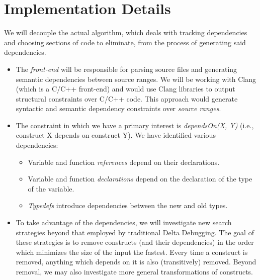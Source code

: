 \documentclass[11pt]{article}
\begin{document}
\section{Implementation Details}
We will decouple the actual algorithm, which deals with tracking dependencies
and choosing sections of code to eliminate, from the process of generating said
dependencies.

\begin{itemize}
\item The \emph{front-end} will be responsible for parsing source files and
  generating semantic dependencies between source ranges. We will be working
  with Clang (which is a C/C++ front-end) and would use Clang libraries to
  output structural constraints over C/C++ code.  This approach would generate
  syntactic and semantic dependency constraints over \emph{source ranges}.
\item The constraint in which we have a primary interest is \emph{dependsOn(X,
  Y)} (i.e., construct X depends on construct Y).  We have identified various
  dependencies:

\begin{itemize}
\item{Variable and function \emph{references} depend on their declarations.}
\item{Variable and function \emph{declarations} depend on the declaration of the
type of the variable.}
\item{\emph{Typedefs} introduce dependencies between the new and old types.}
\end{itemize}

\item To take advantage of the dependencies, we will investigate new search
  strategies beyond that employed by traditional Delta Debugging.  The goal
  of these strategies is to remove constructs (and their dependencies) in the
  order which minimizes the size of the input the fastest.
  Every time a construct is removed, anything which depends on
  it is also (transitively) removed.  Beyond removal, we may also investigate
  more general transformations of constructs.%


\end{itemize}
\end{document}
